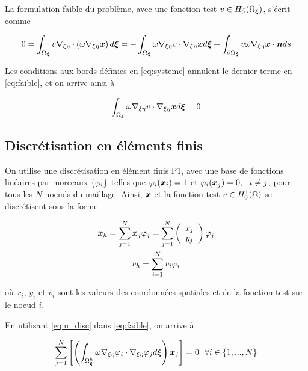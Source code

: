 \indent La formulation faible du problème, avec une fonction test  \(v \in H_0^1(\Omega_{\boldsymbol{\xi}})\), s'écrit comme

\begin{equation}
	\label{eq:faible}
	0 = \int_{\Omega_{\boldsymbol{\xi}}}{v\nabla_{\xi\eta} \cdot \left( \omega \nabla_{\xi\eta} \boldsymbol{x} \right) d\boldsymbol{\xi}} = -\int_{\Omega_{\boldsymbol{\xi}}}{\omega \nabla_{\xi\eta} v \cdot \nabla_{\xi\eta} \boldsymbol{x} d\boldsymbol{\xi}} + \int_{\partial \Omega_{\boldsymbol{\xi}}}{v\omega\nabla_{\xi\eta} \boldsymbol{x} \cdot \boldsymbol{n} ds} 
\end{equation}

\indent Les conditions aux bords définies en \eqref{eq:systeme} annulent le dernier terme en \eqref{eq:faible}, et on arrive ainsi à 

\begin{equation*}
	\int_{\Omega_{\boldsymbol{\xi}}}{\omega \nabla_{\xi\eta} v \cdot \nabla_{\xi\eta} \boldsymbol{x} d\boldsymbol{\xi}} = 0
\end{equation*}




\subsection{Discrétisation en éléments finis}

\indent On utilise une discrétisation en élément finis P1, avec une base de fonctions linéaires par morceaux \(\{\varphi_i\}\) telles que $\varphi_i(\boldsymbol{x}_i) = 1$ et $\varphi_i(\boldsymbol{x}_j) = 0,\ \ i \neq j$, pour tous les $N$ noeuds du maillage. Ainsi, \(\boldsymbol{x}\) et la fonction test \(v \in H_0^1(\Omega)\) se discrétisent sous la forme

\begin{equation}
  \label{eq:u_disc}
  \begin{gathered}
  \boldsymbol{x}_h = \sum_{j=1}^N{\boldsymbol{x}_j\varphi_j} = \sum_{j=1}^N{ \left( \begin{array}{c}  x_j \\ y_j \end{array} \right)    \varphi_j} \\
  v_h = \sum_{i=1}^N{v_i\varphi_i} 
  \end{gathered}
\end{equation}

\noindent où $x_i$, $y_i$ et $v_i$ sont les valeurs des coordonnées spatiales et de la fonction test sur le noeud $i$. 

\indent En utilisant \eqref{eq:u_disc} dans \eqref{eq:faible}, on arrive à

\begin{equation*}
	\sum_{j=1}^N{ \left[  \left( \int_{\Omega_{\boldsymbol{\xi}}^h}{ \omega \nabla_{\xi\eta} \varphi_i \cdot \nabla_{\xi\eta} \varphi_j  d\boldsymbol{\xi}}  \right)  \boldsymbol{x}_j \right] } = 0 \ \ \forall i \in \{1,...,N\}
\end{equation*}

